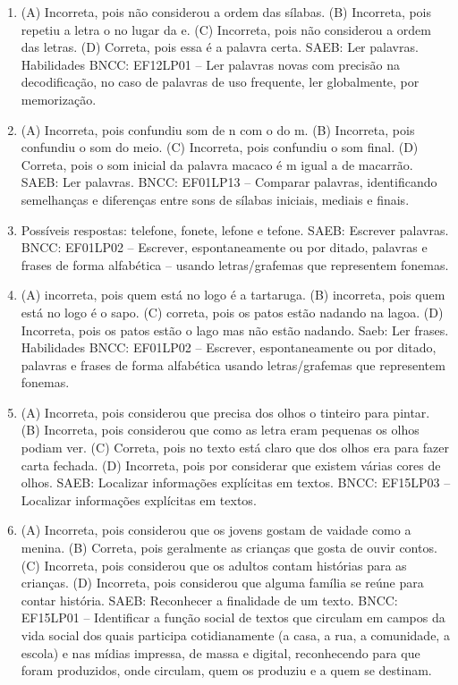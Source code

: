\begin{enumerate}
\item
(A) Incorreta, pois não considerou a ordem das sílabas.
(B) Incorreta, pois repetiu a letra o no lugar da e.
(C) Incorreta, pois não considerou a ordem das letras.
(D) Correta, pois essa é a palavra certa.
SAEB: Ler palavras. 
Habilidades BNCC:
EF12LP01 -- Ler palavras novas com precisão na decodificação, no caso de palavras de uso frequente, ler globalmente, por memorização.

\item
(A) Incorreta, pois confundiu som de n com o do m.
(B) Incorreta, pois confundiu o som do meio.
(C) Incorreta, pois confundiu o som final.
(D) Correta, pois o som inicial da palavra macaco é m igual a de
macarrão.
SAEB: Ler palavras. 
BNCC: EF01LP13 -- Comparar palavras, identificando semelhanças e diferenças entre sons de sílabas iniciais, mediais e finais.

\item
Possíveis respostas:
telefone, fonete, lefone e tefone.
SAEB: Escrever palavras.
BNCC: EF01LP02 -- Escrever, espontaneamente ou por ditado, palavras e frases de forma alfabética -- usando letras/grafemas que representem fonemas.

\item
(A) incorreta, pois quem está no logo é a tartaruga.
(B) incorreta, pois quem está no logo é o sapo.
(C) correta, pois os patos estão nadando na lagoa.
(D) Incorreta, pois os patos estão o lago mas não estão nadando.
Saeb: Ler frases.
Habilidades BNCC: EF01LP02 -- Escrever, espontaneamente ou por ditado, palavras e frases de
forma alfabética usando letras/grafemas que representem fonemas.

\item
(A) Incorreta, pois considerou que precisa dos olhos o tinteiro para
pintar.
(B) Incorreta, pois considerou que como as letra eram pequenas os olhos
podiam ver.
(C) Correta, pois no texto está claro que dos olhos era para fazer carta
fechada.
(D) Incorreta, pois por considerar que existem várias cores de
olhos.
SAEB: Localizar informações explícitas em textos. 
BNCC: EF15LP03 -- Localizar informações explícitas em textos.

\item
(A) Incorreta, pois considerou que os jovens gostam de vaidade como a
menina.
(B) Correta, pois geralmente as crianças que gosta de ouvir contos.
(C) Incorreta, pois considerou que os adultos contam histórias para as
crianças.
(D) Incorreta, pois considerou que alguma família se reúne para contar
história.
SAEB: Reconhecer a finalidade de um texto.
BNCC: EF15LP01 -- Identificar a função social de textos que
circulam em campos da vida social dos quais participa cotidianamente (a
casa, a rua, a comunidade, a escola) e nas mídias impressa, de massa e
digital, reconhecendo para que foram produzidos, onde circulam, quem os
produziu e a quem se destinam.


\end{enumerate}
